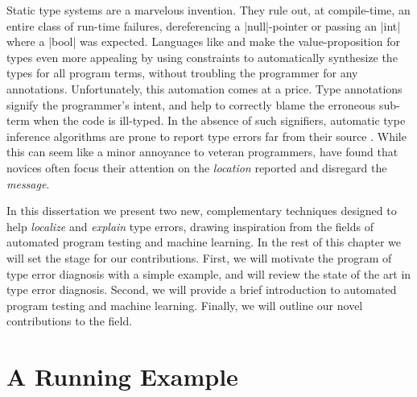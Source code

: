 Static type systems are a marvelous invention.
%
They rule out, at compile-time, an entire class of run-time failures,
\eg dereferencing a |null|-pointer or passing an |int| where a |bool|
was expected.
%
Languages like \ocaml and \haskell make
the value-proposition for types even more
appealing by using constraints to automatically
synthesize the types for all program terms,
without troubling the programmer for any
annotations.
%
Unfortunately, this automation comes at a price.
%
Type annotations signify the programmer's intent, and help to correctly
blame the erroneous sub-term when the code is ill-typed.
%
In the absence of such signifiers, automatic type inference algorithms
are prone to report type errors far from their source
\citep{Wand1986-nw}.
%
While this can seem like a minor annoyance to veteran programmers,
\citet{Joosten1993-yx} have found that novices often focus their
attention on the \emph{location} reported and disregard the
\emph{message}.

In this dissertation we present two new, complementary techniques
designed to help \emph{localize} and \emph{explain} type errors, drawing
inspiration from the fields of automated program testing and machine
learning.
%
In the rest of this chapter we will set the stage for our contributions.
%
First, we will motivate the program of type error diagnosis with a
simple example, and will review the state of the art in type error
diagnosis.
%
Second, we will provide a brief introduction to automated program
testing and machine learning.
%
Finally, we will outline our novel contributions to the field.


\section{A Running Example}
\label{sec:intro:sumList}

